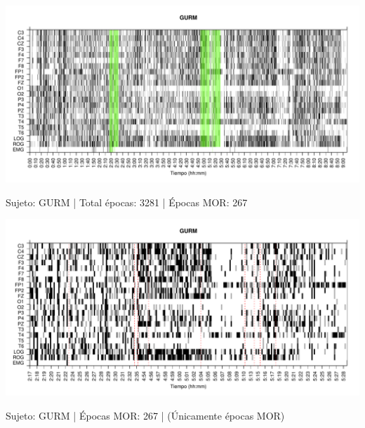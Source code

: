 \begin{SidewaysFigure}
\centering
\includegraphics[width=\linewidth]
{./material_bonito170220/GH24031950SUENO_267_mor267_tot3281_est_total.pdf} 
\caption{Sujeto: GURM | Total \'epocas: 3281 | \'Epocas MOR: 267}
\end{SidewaysFigure}
\begin{SidewaysFigure}
\centering
\includegraphics[width=\linewidth]
{./material_bonito170220/GH24031950SUENO_267_mor267_tot267_est_mor.pdf} 
\caption{Sujeto: GURM | \'Epocas MOR: 267 | (\'Unicamente \'epocas MOR)}
\end{SidewaysFigure}


